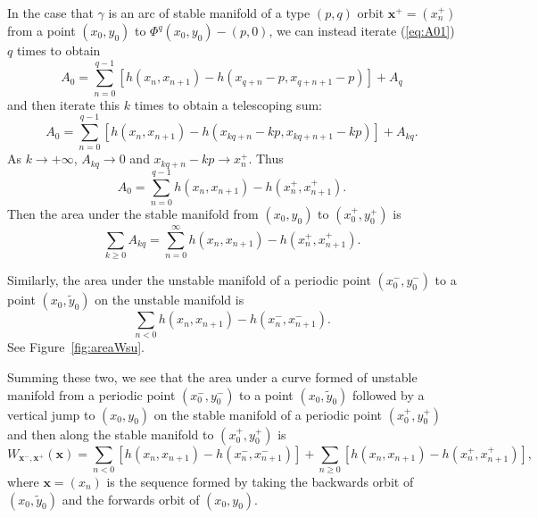 \documentclass[12pt]{article}
\newcommand{\xbf}{{\mathbf{x}}}
\begin{document}
In the case that $\gamma$ is an arc of stable manifold of a type $(p,q)$ orbit
  $\xbf^+=(x_n^+)$  from a point $(x_0,y_0)$ to $\Phi^q(x_0,y_0)-(p,0)$, we can instead iterate (\ref{eq:A01}) $q$ times to obtain
$$A_0 = \sum_{n=0}^{q-1} [h(x_n,x_{n+1})-h(x_{q+n}-p,x_{q+n+1}-p)] + A_q$$
and then iterate this $k$ times to obtain a telescoping sum:
$$A_0 = \sum_{n=0}^{q-1} [h(x_n,x_{n+1})-h(x_{kq+n}-kp,x_{kq+n+1}-kp)]+A_{kq}.$$
As $k \to +\infty$, $A_{kq}\to 0$ and $x_{kq+n}-kp \to x^+_n$.  Thus
$$A_0 = \sum_{n=0}^{q-1} h(x_n,x_{n+1})-h(x^+_{n},x^+_{n+1}).$$
Then the area under the stable manifold from $(x_0,y_0)$ to $(x^+_0,y^+_0)$ is
$$\sum_{k\ge 0} A_{kq} = \sum_{n=0}^\infty h(x_n,x_{n+1})-h(x^+_{n},x^+_{n+1}).$$

Similarly, the area under the unstable manifold of a periodic point $(x^-_0,y^-_0)$ to a point $(x_0,\tilde{y}_0)$ on the unstable manifold is
$$\sum_{n<0} h(x_n,x_{n+1})-h(x^-_{n},x^-_{n+1}).$$
See Figure~\ref{fig:areaWsu}.


Summing these two, we see that the area under a curve formed of unstable manifold from a periodic point $(x^-_0,y^-_0)$ to a point $(x_0,\tilde{y}_0)$  followed by a vertical jump to $(x_0,{y}_0)$ on the stable manifold of a periodic point $(x^+_0,y^+_0)$ and then along the stable manifold to $(x^+_0,y^+_0)$ is
$$W_{\xbf^-,\xbf^+}(\xbf) = \sum_{n<0} [h(x_n,x_{n+1})-h(x^-_{n},x^-_{n+1})] + \sum_{n\ge 0} [h(x_n,x_{n+1})-h(x^+_{n},x^+_{n+1})],$$
where $\xbf = (x_n)$ is the sequence formed by taking the backwards orbit of $(x_0,\tilde{y}_0)$ and the forwards orbit of $(x_0,{y}_0)$.
\end{document}
